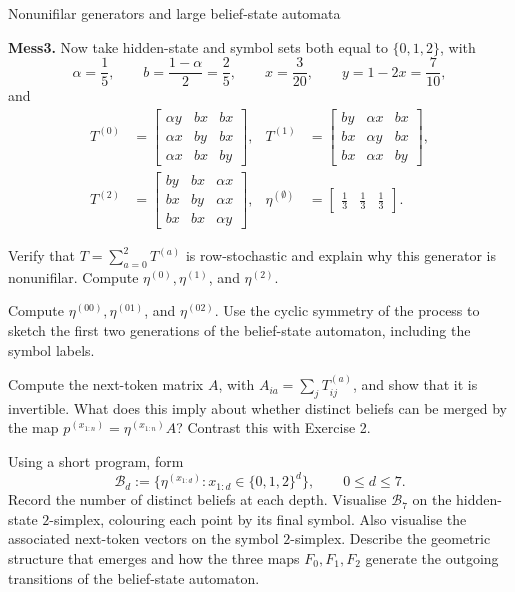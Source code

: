 {\begin{exercise}[Extension]{Nonunifilar generators and large belief-state automata}
\begin{parts}
    \item \textbf{Mess3.}
      Now take hidden-state and symbol sets both equal to $\{0,1,2\}$, with
      \[
        \alpha=\frac15,\qquad b=\frac{1-\alpha}{2}=\frac25,
        \qquad x=\frac3{20},\qquad y=1-2x=\frac7{10},
      \]
      and
      \[
        \begin{aligned}
          T^{(0)}&=
          \begin{bmatrix}
            \alpha y&bx&bx\\ \alpha x&by&bx\\ \alpha x&bx&by
          \end{bmatrix},&
          T^{(1)}&=
          \begin{bmatrix}
            by&\alpha x&bx\\ bx&\alpha y&bx\\ bx&\alpha x&by
          \end{bmatrix},\\[1mm]
          T^{(2)}&=
          \begin{bmatrix}
            by&bx&\alpha x\\ bx&by&\alpha x\\ bx&bx&\alpha y
          \end{bmatrix},&
          \eta^{(\emptyset)}&=
          \begin{bmatrix}\tfrac13&\tfrac13&\tfrac13\end{bmatrix}.
        \end{aligned}
      \]
      \begin{subparts}
        \item Verify that $T=\sum_{a=0}^2T^{(a)}$ is row-stochastic and
          explain why this generator is nonunifilar. Compute
          $\eta^{(0)},\eta^{(1)}$, and $\eta^{(2)}$.

        \item Compute $\eta^{(00)},\eta^{(01)}$, and $\eta^{(02)}$. Use the
          cyclic symmetry of the process to sketch the first two generations
          of the belief-state automaton, including the symbol labels.

        \item Compute the next-token matrix $A$, with
          $A_{ia}=\sum_jT^{(a)}_{ij}$, and show that it is invertible. What
          does this imply about whether distinct beliefs can be merged by the
          map $p^{(x_{1:n})}=\eta^{(x_{1:n})}A$? Contrast this with Exercise 2.

        \item Using a short program, form
          \[
            \mathcal B_d:=
            \bigl\{\eta^{(x_{1:d})}:x_{1:d}\in\{0,1,2\}^d\bigr\},
            \qquad 0\leq d\leq7.
          \]
          Record the number of distinct beliefs at each depth. Visualise
          $\mathcal B_7$ on the hidden-state $2$-simplex, colouring each point
          by its final symbol. Also visualise the associated next-token
          vectors on the symbol $2$-simplex. Describe the geometric structure
          that emerges and how the three maps $F_0,F_1,F_2$ generate the
          outgoing transitions of the belief-state automaton.


\end{subparts}
\end{parts}
\end{exercise}}
